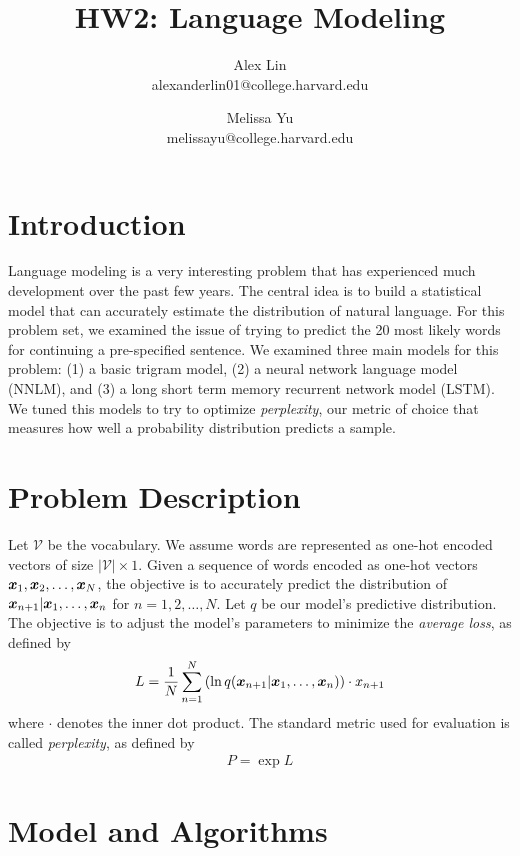 \documentclass[11pt]{article}
\title{HW2: Language Modeling}
\author{Alex Lin \\ alexanderlin01@college.harvard.edu \and Melissa Yu \\ melissayu@college.harvard.edu }
\begin{document}
\maketitle{}
\section{Introduction}

Language modeling is a very interesting problem that has experienced much development over the past few years.  The central idea is to build a statistical model that can accurately estimate the distribution of natural language.  For this problem set, we examined the issue of trying to predict the 20 most likely words for continuing a pre-specified sentence.  We examined three main models for this problem: (1) a basic trigram model, (2) a neural network language model (NNLM), and (3) a long short term memory recurrent network model (LSTM).  We tuned this models to try to optimize \emph{perplexity}, our metric of choice that measures how well a probability distribution predicts a sample.

\section{Problem Description}

Let $\mathcal{V}$ be the vocabulary.  We assume words are represented as one-hot encoded vectors of size $\lvert \mathcal{V} \rvert \times 1$.  Given a sequence of words encoded as one-hot vectors $\boldsymbol{x}_1, \boldsymbol{x}_2, \ldots, \boldsymbol{x}_N$, the objective is to accurately predict the distribution of $\boldsymbol{x}_{n + 1} \vert \boldsymbol{x}_1, \ldots, \boldsymbol{x}_{n}$ for $n = 1, 2, \ldots, N$.  Let $q$ be our model's predictive distribution.  The objective is to adjust the model's parameters to minimize the \emph{average loss}, as defined by
\begin{align*}
L = \frac{1}{N} \sum_{n=1}^N \left(\ln q(\boldsymbol{x}_{n + 1} \vert \boldsymbol{x}_1, \ldots, \boldsymbol{x}_{n}) \right) \cdot x_{n+1} 
\end{align*}
where $\cdot$ denotes the inner dot product.  The standard metric used for evaluation is called \emph{perplexity}, as defined by
\begin{align*}
P = \exp L
\end{align*}

\section{Model and Algorithms}
\end{document}
